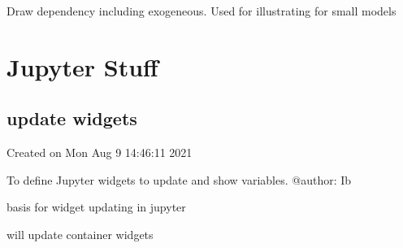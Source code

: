 \documentclass[letterpaper,10pt,english]{sphinxmanual}
\begin{document}

\begin{fulllineitems}
\label{\detokenize{index:modelnet.drawendoexo}}
\pysigstartsignatures
{}
\pysigstopsignatures
\sphinxAtStartPar
Draw dependency including exogeneous. Used for illustrating for small models

\end{fulllineitems}



\chapter{Jupyter Stuff}
\label{\detokenize{index:jupyter-stuff}}

\section{update widgets}
\label{\detokenize{index:module-modelwidget}}\label{\detokenize{index:update-widgets}}
\sphinxAtStartPar
Created on Mon Aug  9 14:46:11 2021

\sphinxAtStartPar
To define Jupyter widgets to update and show variables.
@author: Ib

\begin{fulllineitems}
\label{\detokenize{index:modelwidget.basewidget}}
\pysigstartsignatures
{}
\pysigstopsignatures
\sphinxAtStartPar
basis for widget updating in jupyter

\begin{fulllineitems}
\label{\detokenize{index:modelwidget.basewidget.update_df}}
\pysigstartsignatures
{}
\pysigstopsignatures
\sphinxAtStartPar
will update container widgets

\end{fulllineitems}


\end{fulllineitems}
\end{document}
